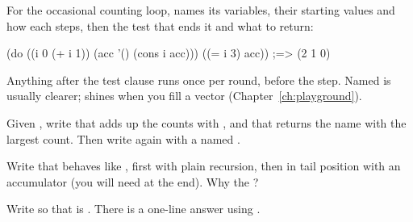 For the occasional counting loop,  names its variables, their
starting values and how each steps, then the test that ends it and what to
return:

\begin{scm}
(do ((i 0 (+ i 1))
     (acc '() (cons i acc)))
    ((= i 3) acc))                   ;=> (2 1 0)
\end{scm}

Anything after the test clause runs once per round, before the step.
Named  is usually clearer;  shines when you fill a
vector (Chapter~\ref{ch:playground}).

\begin{puzzle}
Given , write  that adds up the counts with
, and  that returns the name with the
largest count. Then write  again with a named .
\end{puzzle}

\begin{puzzle}
Write  that behaves like , first with plain
recursion, then in tail position with an accumulator (you will need
 at the end). Why the ?
\end{puzzle}

\begin{puzzle}[ 5: zip]
Write  so that  is
. There is a one-line answer using
.
\end{puzzle}
